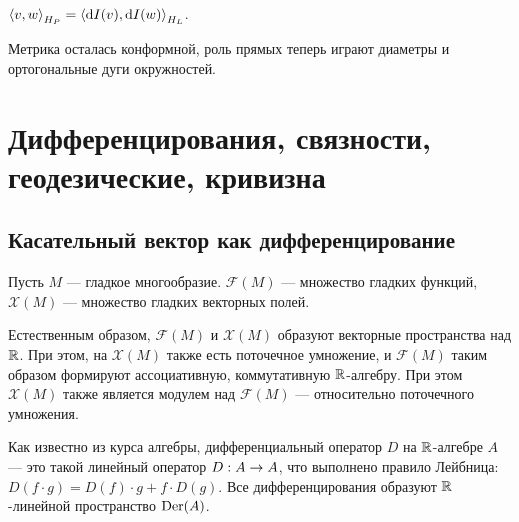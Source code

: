 \documentclass[a4paper]{report}
\begin{document}
    $\left\langle v, w\right\rangle_{H_P} = \left\langle\operatorname{d}\! I(v), \operatorname{d}\! I(w)\right\rangle_{H_L}$.

    Метрика осталась конформной, роль прямых теперь играют диаметры и ортогональные дуги окружностей.
    \chapter{Дифференцирования, связности, геодезические, кривизна}
    \section{Касательный вектор как дифференцирование}
    Пусть $M$ --- гладкое многообразие. $\mathscr{F}(M)$ --- множество гладких функций, $\mathscr{X}(M)$ --- множество гладких векторных полей.

    Естественным образом, $\mathscr{F}(M)$ и $\mathscr{X}(M)$ образуют векторные пространства над $\mathbb{R}$.
    При этом, на $\mathscr{X}(M)$ также есть поточечное умножение, и $\mathscr{F}(M)$ таким образом формируют ассоциативную, коммутативную $\mathbb{R}$-алгебру.
    При этом $\mathscr{X}(M)$ также является модулем над $\mathscr{F}(M)$ --- относительно поточечного умножения.

    Как известно из курса алгебры, дифференциальный оператор $D$ на $\mathbb{R}$-алгебре $A$ --- это такой линейный оператор $D: A \rightarrow A$, что выполнено правило Лейбница: $D(f \cdot g) = D(f) \cdot g + f \cdot D(g)$.
    Все дифференцирования образуют $\mathbb{R}$-линейной пространство $\operatorname{Der}(A)$.
\end{document}
